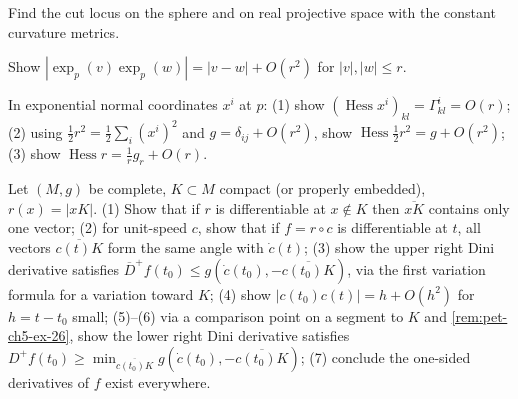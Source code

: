\begin{remark}
  \label{rem:pet-ch5-ex-25}
  Find the cut locus on the sphere and on real projective space with the constant
  curvature metrics.
\end{remark}

\begin{remark}
  \label{rem:pet-ch5-ex-26}
  Show $|\exp_p(v)\exp_p(w)|=|v-w|+O(r^2)$ for $|v|,|w|\le r$.
\end{remark}

\begin{remark}
  \label{rem:pet-ch5-ex-27}
  In exponential normal coordinates $x^i$ at $p$: (1) show
  $(\operatorname{Hess}x^i)_{kl}=\Gamma^i_{kl}=O(r)$; (2) using
  $\tfrac12r^2=\tfrac12\sum_i(x^i)^2$ and $g=\delta_{ij}+O(r^2)$, show
  $\operatorname{Hess}\tfrac12r^2=g+O(r^2)$; (3) show $\operatorname{Hess}r=
  \tfrac1rg_r+O(r)$.
\end{remark}

\begin{remark}
  \label{rem:pet-ch5-ex-28}
  Let $(M,g)$ be complete, $K\subset M$ compact (or properly embedded), $r(x)=|xK|$.
  (1) Show that if $r$ is differentiable at $x\notin K$ then $\overline{xK}$
  contains only one vector; (2) for unit-speed $c$, show that if $f=r\circ c$ is
  differentiable at $t$, all vectors $\overline{c(t)K}$ form the same angle with
  $\dot c(t)$; (3) show the upper right Dini derivative satisfies
  $\overline D^+f(t_0)\le g(\dot c(t_0),-\overline{c(t_0)K})$, via the first
  variation formula for a variation toward $K$; (4) show
  $|c(t_0)c(t)|=h+O(h^2)$ for $h=t-t_0$ small; (5)–(6) via a comparison point on a
  segment to $K$ and \cref{rem:pet-ch5-ex-26}, show the lower right Dini derivative
  satisfies $D^+f(t_0)\ge\min_{\overline{c(t_0)K}}g(\dot c(t_0),-\overline{c(t_0)K})$;
  (7) conclude the one-sided derivatives of $f$ exist everywhere.
\end{remark}

